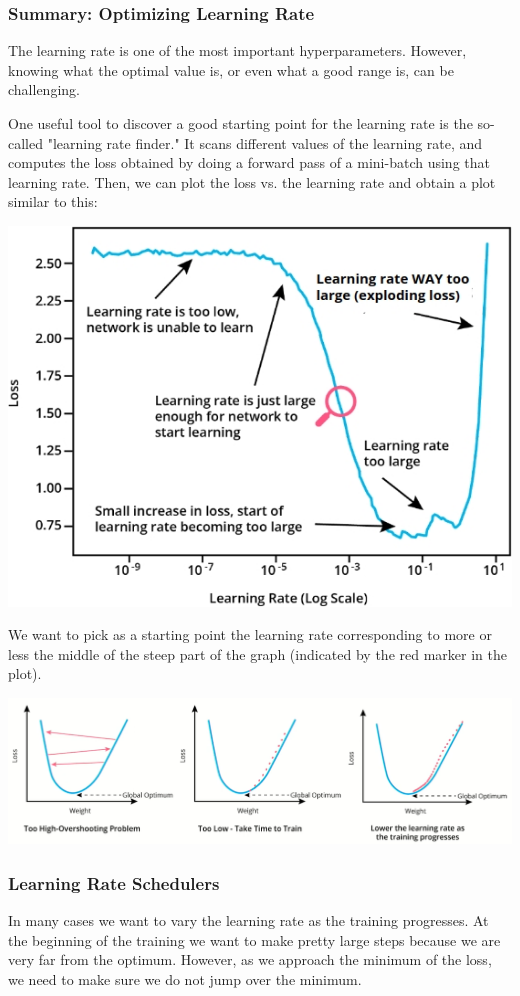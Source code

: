 \subsubsection{Summary: Optimizing Learning Rate}

The learning rate is one of the most important hyperparameters. However, knowing what the optimal value is, or even what a good range is, can be challenging. \newline

One useful tool to discover a good starting point for the learning rate is the so-called "learning rate finder." It scans different values of the learning rate, and computes the loss obtained by doing a forward pass of a mini-batch using that learning rate. Then, we can plot the loss vs. the learning rate and obtain a plot similar to this:

\includegraphics[width=0.5\linewidth]{img//cnn//depth/lr-finder.jpeg}

We want to pick as a starting point the learning rate corresponding to more or less the middle of the steep part of the graph (indicated by the red marker in the plot).

\includegraphics[width=1\linewidth]{img//cnn//depth/learningrateoptimization.png}

\subsubsection{Learning Rate Schedulers}

In many cases we want to vary the learning rate as the training progresses. At the beginning of the training we want to make pretty large steps because we are very far from the optimum. However, as we approach the minimum of the loss, we need to make sure we do not jump over the minimum. \newline

